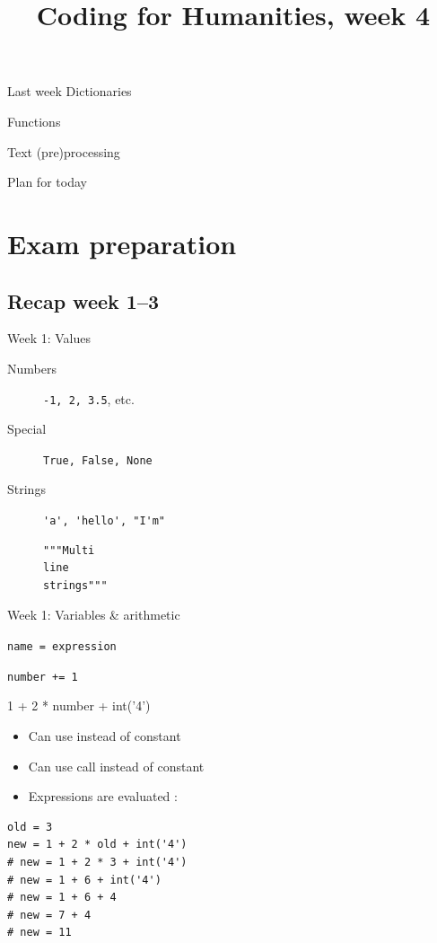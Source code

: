 \documentclass[aspectratio=169,usenames,dvipsnames]{beamer}
\title{Coding for Humanities, week 4}
\begin{document}
\begin{frame}
 \titlepage
\end{frame}

\begin{frame}{Last week}
    \large
    Dictionaries

    \vspace{1em}
    Functions

    \vspace{1em}
    Text (pre)processing
\end{frame}

\begin{frame}{Plan for today}
 \tableofcontents
\end{frame}

\section{Exam preparation}
\frame{\tableofcontents[currentsection]}

\subsection{Recap week 1--3}
\begin{frame}[fragile]{Week 1: Values}
    \begin{description}
        \item[Numbers] \lstinline{-1, 2, 3.5}, etc.
        \item[Special] \lstinline{True, False, None}
        \item[Strings] \lstinline{'a', 'hello', "I'm"}
\begin{lstlisting}
"""Multi
line
strings"""
\end{lstlisting}
    \end{description}
\end{frame}

\begin{frame}[fragile]{Week 1: Variables \& arithmetic}
    \begin{description}[Assignment]
        \item[Assignment] \lstinline{name = expression}
        \item[Increment] \lstinline{number += 1}
        \item[Expressions] 1 + 2 * number + int('4')
    \end{description}
    \pause
    \begin{itemize}
        \item Can use  instead of constant
        \item Can use  call instead of constant
        \item Expressions are evaluated :
    \end{itemize}
\begin{lstlisting}
old = 3
new = 1 + 2 * old + int('4')
# new = 1 + 2 * 3 + int('4')
# new = 1 + 6 + int('4')
# new = 1 + 6 + 4
# new = 7 + 4
# new = 11
\end{lstlisting}
\end{frame}
\end{document}
